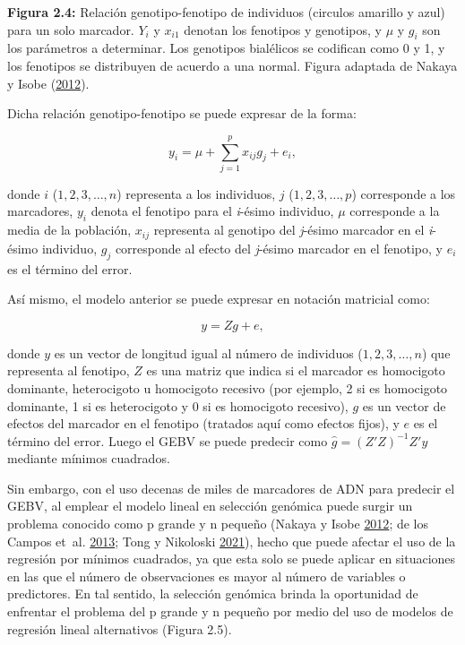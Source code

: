 \documentclass[11pt,spanish,a4paper,oneside,]{book} %
\begin{document}
\begin{center}
\textbf{Figura 2.4:} Relación genotipo-fenotipo de individuos (circulos amarillo y azul) para un solo marcador. \(Y_{i}\) y \(x_{i1}\) denotan los fenotipos y genotipos, y \(\mu\) y \(g_{i}\) son los parámetros a determinar. Los genotipos bialélicos se codifican como 0 y 1, y los fenotipos se distribuyen de acuerdo a una normal. Figura adaptada de Nakaya y Isobe (\protect\hyperlink{ref-cite:6}{2012}).

\end{center}

Dicha relación genotipo-fenotipo se puede expresar de la forma:

\begin{equation}
y_{i} = \mu + \sum_{j = 1}^{p}x_{ij}g_{j} + e_{i},
\end{equation}

donde \(i\) (\(1, 2, 3, …, n\)) representa a los individuos, \(j\) (\(1, 2, 3, …, p\)) corresponde a los marcadores, \(y_{i}\) denota el fenotipo para el \emph{i}-ésimo individuo, \(\mu\) corresponde a la media de la población, \(x_{ij}\) representa al genotipo del \emph{j}-ésimo marcador en el \emph{i}-ésimo individuo, \(g_{j}\) corresponde al efecto del \emph{j}-ésimo marcador en el fenotipo, y \(e_{i}\) es el término del error.

Así mismo, el modelo anterior se puede expresar en notación matricial como:

\begin{equation}
y = Zg + e,
\end{equation}

donde \(y\) es un vector de longitud igual al número de individuos (\(1, 2, 3, …, n\)) que representa al fenotipo, \(Z\) es una matriz que indica si el marcador es homocigoto dominante, heterocigoto u homocigoto recesivo (por ejemplo, 2 si es homocigoto dominante, 1 si es heterocigoto y 0 si es homocigoto recesivo), \(g\) es un vector de efectos del marcador en el fenotipo (tratados aquí como efectos fijos), y \(e\) es el término del error. Luego el GEBV se puede predecir como \(\hat{g} = (Z'Z)^{- 1} Z'y\) mediante mínimos cuadrados.

Sin embargo, con el uso decenas de miles de marcadores de ADN para predecir el GEBV, al emplear el modelo lineal en selección genómica puede surgir un problema conocido como p grande y n pequeño (Nakaya y Isobe \protect\hyperlink{ref-cite:6}{2012}; de los Campos et~al. \protect\hyperlink{ref-cite:31}{2013}; Tong y Nikoloski \protect\hyperlink{ref-cite:7}{2021}), hecho que puede afectar el uso de la regresión por mínimos cuadrados, ya que esta solo se puede aplicar en situaciones en las que el número de observaciones es mayor al número de variables o predictores. En tal sentido, la selección genómica brinda la oportunidad de enfrentar el problema del p grande y n pequeño por medio del uso de modelos de regresión lineal alternativos (Figura 2.5).
\end{document}
